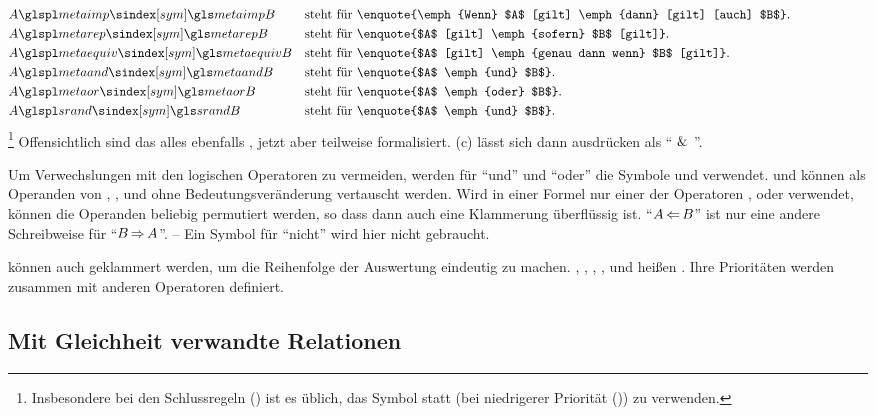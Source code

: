 \begin{align}
	& A \glsSym{metaimp}   B & \text{steht für }
	& \text{\enquote{\emph{Wenn} $A$ [gilt] \emph{dann} [gilt] [auch] $B$}.}
	\\
	& A \glsSym{metarep}   B & \text{steht für }
	& \text{\enquote{$A$ [gilt] \emph{sofern}          $B$ [gilt]}.}
	\\
	& A \glsSym{metaequiv} B & \text{steht für }
	& \text{\enquote{$A$ [gilt] \emph{genau dann wenn} $B$ [gilt]}.}
	\\
	& A \glsSym{metaand}   B & \text{steht für }
	& \text{\enquote{$A$ \emph{und}  $B$}.}
	\\
	& A \glsSym{metaor}    B & \text{steht für }
	& \text{\enquote{$A$ \emph{oder} $B$}.}
	\\
	& A \glsSym{srand}     B & \text{steht für }
	& \text{\enquote{$A$ \emph{und}  $B$}.}
	\formulatoleft
\end{align}
\footnote{%
	Insbesondere bei den Schlussregeln () ist es üblich, das Symbol \symqt{\srand} statt \symqt{\metaandsym} (bei niedrigerer Priorität ()) zu verwenden.%
}
Offensichtlich sind das alles ebenfalls , jetzt aber teilweise formalisiert.
(c) lässt sich dann ausdrücken als \enquote{ $\operatorname{\&}$ }.

Um Verwechslungen mit den logischen Operatoren zu vermeiden, werden für \enquote{und} und \enquote{oder} die Symbole \symqt{\metaandsym} und \symqt{\metaorsym} verwendet.
 und  können als Operanden von \opqt{\metaequiv}, \opqt{\metaandsym}, \opqt{\metaorsym} und \opqt{\srand} ohne Bedeutungsveränderung vertauscht werden.
Wird in einer Formel nur einer der Operatoren \opqt{\metaandsym}, \opqt{\metaorsym} oder \opqt{\srand} verwendet, können die Operanden beliebig permutiert werden, so dass dann auch eine Klammerung überflüssig ist.
\enquote{$A \operatorname{\Leftarrow} B$} ist nur eine andere Schreibweise für \enquote{$B \operatorname{\Rightarrow} A$}.
-- Ein Symbol für \enquote{nicht} wird hier nicht gebraucht.

 können auch geklammert werden, um die Reihenfolge der Auswertung eindeutig zu machen.
\opqt{\metaimp}, \opqt{\metarep}, \opqt{\metaequiv}, \opqt{\metaandsym}, \opqt{\metaorsym} und \opqt{\srand} heißen \emph{}.
Ihre Prioritäten werden  zusammen mit anderen Operatoren definiert.

\subsection{Mit Gleichheit verwandte Relationen}%
\label{sub:Gleichheit}


